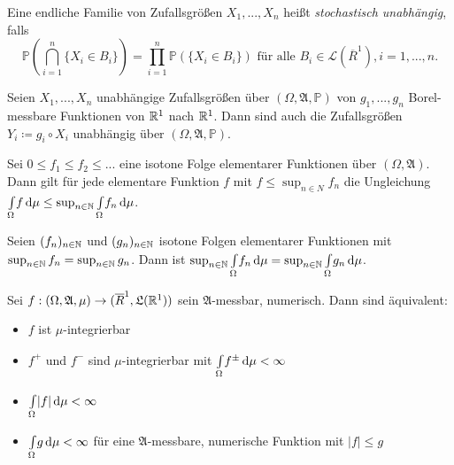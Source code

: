 \documentclass{cheat-sheet}
\newcommand{\Alg}{\mathfrak{A}}
\newcommand{\LebAlg}{\mathfrak{L}} %
\renewcommand{\P}{\mathbb{P}}
\newcommand{\IntOmu}[1]{\Int{\Omega}{}{#1}{\mu}} %
\begin{document}
\begin{defn}
  Eine endliche Familie von Zufallsgrößen $X_1, ..., X_n$ heißt \emph{stochastisch unabhängig}, falls
  \[ \P(\bigcap_{i=1}^n \{ X_i \in B_i \}) = \prod_{i=1}^n \P(\{ X_i \in B_i \}) \text{ für alle } B_i \in \mathcal{L}(\overline{R}^1), i = 1, ..., n. \]
\end{defn}

\begin{satz}
  Seien $X_1, ..., X_n$ unabhängige Zufallsgrößen über $(\Omega, \Alg, \P)$ von $g_1, ..., g_n$ Borel-messbare Funktionen von $\mathbb{R}^1$ nach $\mathbb{R}^1$. Dann sind auch die Zufallsgrößen $Y_i \coloneqq g_i \circ X_i$ unabhängig über $(\Omega, \Alg, \P)$.
\end{satz}



\begin{satz}
  Sei $0 \leq f_1 \leq f_2 \leq ...$ eine isotone Folge elementarer Funktionen über $(\Omega, \Alg)$. Dann gilt für jede elementare Funktion $f$ mit $f \leq \sup_{n \in N} f_n$ die Ungleichung $\IntOmu{f} \leq \sup_{n \in \N} \IntOmu{f_n}$.
\end{satz}

\begin{satz}
  Seien $(f_n)_{n \in \mathbb{N}}$ und $(g_n)_{n \in \mathbb{N}}$ isotone Folgen elementarer Funktionen mit $\sup_{n \in \mathbb{N}} f_n = \sup_{n \in \mathbb{N}} g_n$. Dann ist $\sup_{n \in \N} \IntOmu{f_n} = \sup_{n \in \N} \IntOmu{g_n}$.
\end{satz}



\begin{satz}
  Sei $f : (\Omega, \Alg, \mu) \to (\overline{R}^1, \LebAlg(\R^1))$ sein $\Alg$-messbar, numerisch. Dann sind äquivalent:
  \begin{itemize}
    \item $f$ ist $\mu$-integrierbar
    \item $f^+$ und $f^-$ sind $\mu$-integrierbar mit $\IntOmu{f^{\pm}} < \infty$
    \item $\IntOmu{|f|} < \infty$
    \item $\IntOmu{g} < \infty$ für eine $\Alg$-messbare, numerische Funktion mit $|f| \leq g$
  \end{itemize}
\end{satz}
\end{document}
